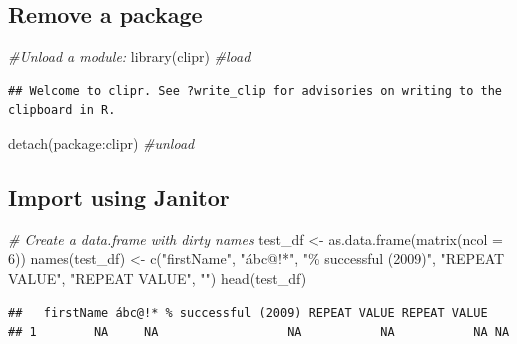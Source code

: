 \documentclass[
]{article}
\newenvironment{Shaded}{\begin{snugshade}}{\end{snugshade}}
\newcommand{\AttributeTok}[1]{\textcolor[rgb]{0.77,0.63,0.00}{#1}}
\newcommand{\CommentTok}[1]{\textcolor[rgb]{0.56,0.35,0.01}{\textit{#1}}}
\newcommand{\DecValTok}[1]{\textcolor[rgb]{0.00,0.00,0.81}{#1}}
\newcommand{\FunctionTok}[1]{\textcolor[rgb]{0.00,0.00,0.00}{#1}}
\newcommand{\NormalTok}[1]{#1}
\newcommand{\OtherTok}[1]{\textcolor[rgb]{0.56,0.35,0.01}{#1}}
\newcommand{\SpecialCharTok}[1]{\textcolor[rgb]{0.00,0.00,0.00}{#1}}
\newcommand{\StringTok}[1]{\textcolor[rgb]{0.31,0.60,0.02}{#1}}
\begin{document}
\hypertarget{remove-a-package}{%
\subsection{Remove a package}\label{remove-a-package}}

\begin{Shaded}
\begin{Highlighting}[]
\CommentTok{\#Unload a module: }
\FunctionTok{library}\NormalTok{(clipr) }\CommentTok{\#load}
\end{Highlighting}
\end{Shaded}

\begin{verbatim}
## Welcome to clipr. See ?write_clip for advisories on writing to the clipboard in R.
\end{verbatim}

\begin{Shaded}
\begin{Highlighting}[]
\FunctionTok{detach}\NormalTok{(package}\SpecialCharTok{:}\NormalTok{clipr) }\CommentTok{\#unload}
\end{Highlighting}
\end{Shaded}

\hypertarget{import-using-janitor}{%
\subsection{Import using Janitor}\label{import-using-janitor}}

\begin{Shaded}
\begin{Highlighting}[]
\CommentTok{\# Create a data.frame with dirty names}
\NormalTok{test\_df }\OtherTok{\textless{}{-}} \FunctionTok{as.data.frame}\NormalTok{(}\FunctionTok{matrix}\NormalTok{(}\AttributeTok{ncol =} \DecValTok{6}\NormalTok{))}
\FunctionTok{names}\NormalTok{(test\_df) }\OtherTok{\textless{}{-}} \FunctionTok{c}\NormalTok{(}\StringTok{"firstName"}\NormalTok{, }\StringTok{"ábc@!*"}\NormalTok{, }\StringTok{"\% successful (2009)"}\NormalTok{,}
                    \StringTok{"REPEAT VALUE"}\NormalTok{, }\StringTok{"REPEAT VALUE"}\NormalTok{, }\StringTok{""}\NormalTok{)}
\FunctionTok{head}\NormalTok{(test\_df)}
\end{Highlighting}
\end{Shaded}

\begin{verbatim}
##   firstName ábc@!* % successful (2009) REPEAT VALUE REPEAT VALUE   
## 1        NA     NA                  NA           NA           NA NA
\end{verbatim}
\end{document}
